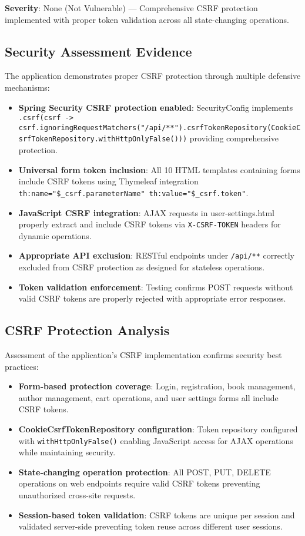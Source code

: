 \documentclass[]{UCD_CS_FYP_Report}
\begin{document}
\textbf{Severity}: None (Not Vulnerable) — Comprehensive CSRF protection implemented with proper token validation across all state-changing operations.

\subsection{Security Assessment Evidence}
The application demonstrates proper CSRF protection through multiple defensive mechanisms:
\begin{itemize}
	\item \textbf{Spring Security CSRF protection enabled}: SecurityConfig implements \texttt{.csrf(csrf -> csrf.ignoringRequestMatchers("/api/**").csrfTokenRepository(CookieCsrfTokenRepository.withHttpOnlyFalse()))} providing comprehensive protection.
	\item \textbf{Universal form token inclusion}: All 10 HTML templates containing forms include CSRF tokens using Thymeleaf integration \texttt{th:name="\${\_csrf.parameterName}" th:value="\${\_csrf.token}"}.
	\item \textbf{JavaScript CSRF integration}: AJAX requests in user-settings.html properly extract and include CSRF tokens via \texttt{X-CSRF-TOKEN} headers for dynamic operations.
	\item \textbf{Appropriate API exclusion}: RESTful endpoints under \texttt{/api/**} correctly excluded from CSRF protection as designed for stateless operations.
	\item \textbf{Token validation enforcement}: Testing confirms POST requests without valid CSRF tokens are properly rejected with appropriate error responses.
\end{itemize}

\subsection{CSRF Protection Analysis}
Assessment of the application's CSRF implementation confirms security best practices:
\begin{itemize}
	\item \textbf{Form-based protection coverage}: Login, registration, book management, author management, cart operations, and user settings forms all include CSRF tokens.
	\item \textbf{CookieCsrfTokenRepository configuration}: Token repository configured with \texttt{withHttpOnlyFalse()} enabling JavaScript access for AJAX operations while maintaining security.
	\item \textbf{State-changing operation protection}: All POST, PUT, DELETE operations on web endpoints require valid CSRF tokens preventing unauthorized cross-site requests.
	\item \textbf{Session-based token validation}: CSRF tokens are unique per session and validated server-side preventing token reuse across different user sessions.
\end{itemize}
\end{document}
